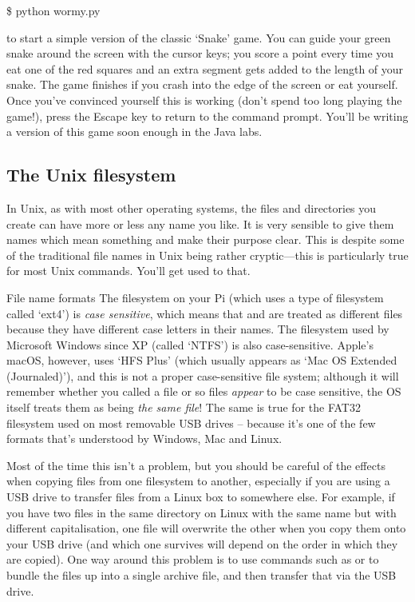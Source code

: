\begin{ttoutenv}
\$ python wormy.py
\end{ttoutenv}

to start a simple version of the classic `Snake' game. You can guide your green snake around the screen with the cursor keys; you score a point every time you eat one of the red squares and an extra segment gets added to the length of your snake. The game finishes if you crash into the edge of the screen or eat yourself. Once you've convinced yourself this is working (don't spend too long playing the game!), press the Escape key to return to the command prompt. You'll be writing a version of this game soon enough in the Java labs.


\FloatBarrier

\subsection{The Unix filesystem}

In Unix, as with most other operating systems, the files and directories you create can have more or less any name you like. It is very sensible to give them names which mean something and make their purpose clear. This is despite some of the traditional file names in Unix being rather cryptic---this is particularly true for most Unix commands. You'll get used to that.

\begin{danger}{File name formats}
The filesystem on your Pi (which uses a type of filesystem called `ext4') is \textit{case sensitive}, which means that  and  are treated as different files because they have different case letters in their names. The filesystem used by Microsoft Windows since XP (called `NTFS') is also case-sensitive. Apple's macOS, however, uses `HFS Plus' (which usually appears as `Mac OS Extended (Journaled)'), and this is not a proper case-sensitive file system; although it will remember whether you called a file  or  so files \textit{appear} to be case sensitive, the OS itself treats them as being \textit{the same file}! The same is true for the FAT32 filesystem used on most removable USB drives -- because it's one of the few formats that's understood by Windows, Mac and Linux.

Most of the time this isn't a problem, but you should be careful of the effects when copying files from one filesystem to another, especially if you are using a USB drive to transfer files from a Linux box to somewhere else. For example, if you have two files in the same directory on Linux with the same name but with different capitalisation, one file will overwrite the other when you copy them onto your USB drive (and which one survives will depend on the order in which they are copied). One way around this problem is to use commands such as   or  to bundle the files up into a single archive file, and then transfer that via the USB drive.
\end{danger}

